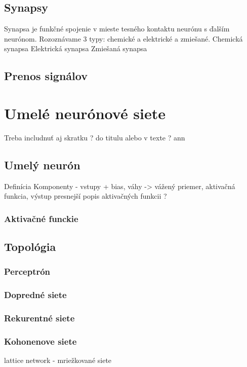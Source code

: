 \subsection{Synapsy}
Synapsa je funkčné spojenie v mieste tesného kontaktu neurónu s ďalším neurónom.
Rozoznávame 3 typy: chemické a elektrické a zmiešané.
\newline
Chemická synapsa
\newline
Elektrická synapsa
\newline
Zmiešaná synapsa

\subsection{Prenos signálov}


\section{Umelé neurónové siete}
Treba includnuť aj skratku ? do titulu alebo v texte ? \acrlong{ann}
\subsection{Umelý neurón}
Definícia
\newline
Komponenty - vstupy + bias, váhy -> vážený priemer, aktivačná funkcia, výstup
\newline
presnejší popis aktivačných funkcii ? 
\subsubsection{Aktivačné funckie}

\subsection{Topológia}
\subsubsection{Perceptrón}
\subsubsection{Dopredné siete}
\subsubsection{Rekurentné siete}
\subsubsection{Kohonenove siete}
lattice network - mriežkované siete
